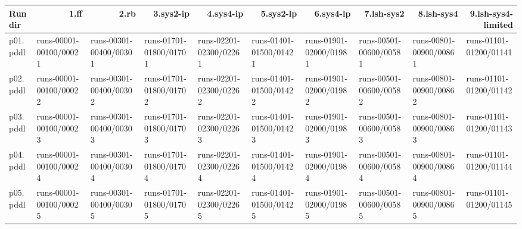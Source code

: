 \documentclass{article}
\begin{document}
\begin{tabular}{@{}lrrrrrrrrr@{}}
Run dir & 1.ff & 2.rb & 3.sys2-ip & 4.sys4-ip & 5.sys2-lp & 6.sys4-lp & 7.lsh-sys2 & 8.lsh-sys4 & 9.lsh-sys4-limited \\
\midrule
p01.pddl & \multicolumn{1}{|l|}{runs-00001-00100/00021} & \multicolumn{1}{|l|}{runs-00301-00400/00301} & \multicolumn{1}{|l|}{runs-01701-01800/01701} & \multicolumn{1}{|l|}{runs-02201-02300/02261} & \multicolumn{1}{|l|}{runs-01401-01500/01421} & \multicolumn{1}{|l|}{runs-01901-02000/01981} & \multicolumn{1}{|l|}{runs-00501-00600/00581} & \multicolumn{1}{|l|}{runs-00801-00900/00861} & \multicolumn{1}{|l|}{runs-01101-01200/01141} \\
p02.pddl & \multicolumn{1}{|l|}{runs-00001-00100/00022} & \multicolumn{1}{|l|}{runs-00301-00400/00302} & \multicolumn{1}{|l|}{runs-01701-01800/01702} & \multicolumn{1}{|l|}{runs-02201-02300/02262} & \multicolumn{1}{|l|}{runs-01401-01500/01422} & \multicolumn{1}{|l|}{runs-01901-02000/01982} & \multicolumn{1}{|l|}{runs-00501-00600/00582} & \multicolumn{1}{|l|}{runs-00801-00900/00862} & \multicolumn{1}{|l|}{runs-01101-01200/01142} \\
p03.pddl & \multicolumn{1}{|l|}{runs-00001-00100/00023} & \multicolumn{1}{|l|}{runs-00301-00400/00303} & \multicolumn{1}{|l|}{runs-01701-01800/01703} & \multicolumn{1}{|l|}{runs-02201-02300/02263} & \multicolumn{1}{|l|}{runs-01401-01500/01423} & \multicolumn{1}{|l|}{runs-01901-02000/01983} & \multicolumn{1}{|l|}{runs-00501-00600/00583} & \multicolumn{1}{|l|}{runs-00801-00900/00863} & \multicolumn{1}{|l|}{runs-01101-01200/01143} \\
p04.pddl & \multicolumn{1}{|l|}{runs-00001-00100/00024} & \multicolumn{1}{|l|}{runs-00301-00400/00304} & \multicolumn{1}{|l|}{runs-01701-01800/01704} & \multicolumn{1}{|l|}{runs-02201-02300/02264} & \multicolumn{1}{|l|}{runs-01401-01500/01424} & \multicolumn{1}{|l|}{runs-01901-02000/01984} & \multicolumn{1}{|l|}{runs-00501-00600/00584} & \multicolumn{1}{|l|}{runs-00801-00900/00864} & \multicolumn{1}{|l|}{runs-01101-01200/01144} \\
p05.pddl & \multicolumn{1}{|l|}{runs-00001-00100/00025} & \multicolumn{1}{|l|}{runs-00301-00400/00305} & \multicolumn{1}{|l|}{runs-01701-01800/01705} & \multicolumn{1}{|l|}{runs-02201-02300/02265} & \multicolumn{1}{|l|}{runs-01401-01500/01425} & \multicolumn{1}{|l|}{runs-01901-02000/01985} & \multicolumn{1}{|l|}{runs-00501-00600/00585} & \multicolumn{1}{|l|}{runs-00801-00900/00865} & \multicolumn{1}{|l|}{runs-01101-01200/01145} \\

\end{tabular}
\end{document}
